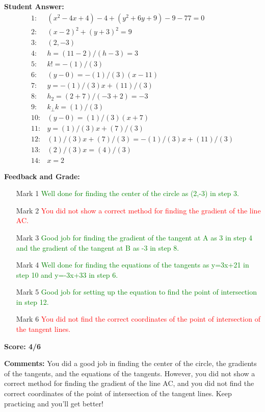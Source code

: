 \documentclass{article}
\begin{document}
\textbf{Student Answer:}
\begin{align*}
1: & (x^{2}-4x+4)-4+(y^{2}+6y+9)-9-77=0 \\
2: & (x-2)^{2}+(y+3)^{2}=9 \\
3: & (2,-3) \\
4: & h=(11-2)/(h-3)=3 \\
5: & k!=-(1)/(3) \\
6: & (y-0)=-(1)/(3)(x-11) \\
7: & y=-(1)/(3)x+(11)/(3) \\
8: & h_2=(2+7)/(-3+2)=-3 \\
9: & k_\perp k=(1)/(3) \\
10: & (y-0)=(1)/(3)(x+7) \\
11: & y=(1)/(3)x+(7)/(3) \\
12: & (1)/(3)x+(7)/(3)=-(1)/(3)x+(11)/(3) \\
13: & (2)/(3)x=(4)/(3) \\
14: & x=2
\end{align*}

\textbf{Feedback and Grade:}
\begin{itemize}
\item[Mark 1] \textcolor{green}{Well done for finding the center of the circle as (2,-3) in step 3.}
\item[Mark 2] \textcolor{red}{You did not show a correct method for finding the gradient of the line AC.}
\item[Mark 3] \textcolor{green}{Good job for finding the gradient of the tangent at A as 3 in step 4 and the gradient of the tangent at B as -3 in step 8.}
\item[Mark 4] \textcolor{green}{Well done for finding the equations of the tangents as y=3x+21 in step 10 and y=-3x+33 in step 6.}
\item[Mark 5] \textcolor{green}{Good job for setting up the equation to find the point of intersection in step 12.}
\item[Mark 6] \textcolor{red}{You did not find the correct coordinates of the point of intersection of the tangent lines.}
\end{itemize}

\textbf{Score: 4/6}

\textbf{Comments:} You did a good job in finding the center of the circle, the gradients of the tangents, and the equations of the tangents. However, you did not show a correct method for finding the gradient of the line AC, and you did not find the correct coordinates of the point of intersection of the tangent lines. Keep practicing and you'll get better!
\end{document}
